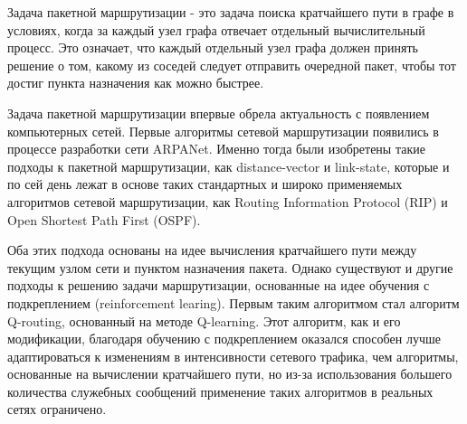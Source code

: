 \documentclass[specification, annotation]{itmo-student-thesis}
\begin{document}
\graphicspath{{img/}}


\tableofcontents

\startprefacepage

Задача пакетной маршрутизации - это задача поиска кратчайшего пути в графе в условиях,
когда за каждый узел графа отвечает отдельный вычислительный процесс. Это
означает, что каждый отдельный узел графа должен принять решение о том, какому
из соседей следует отправить очередной пакет, чтобы тот достиг пункта назначения
как можно быстрее.

Задача пакетной маршрутизации впервые обрела актуальность с появлением
компьютерных сетей. Первые алгоритмы сетевой маршрутизации появились в процессе
разработки сети ARPANet. Именно тогда были изобретены такие подходы к пакетной
маршрутизации, как distance-vector\cite{arpanet-orig} и
link-state\cite{link-state-arpanet}, которые и по сей день лежат в основе таких
стандартных и широко применяемых алгоритмов сетевой маршрутизации, как Routing
Information Protocol (RIP)\cite{rip-rfc} и Open Shortest Path First (OSPF)\cite{ospf-rfc}.

Оба этих подхода основаны на идее вычисления кратчайшего пути между текущим
узлом сети и пунктом назначения пакета. Однако существуют и другие подходы к
решению задачи маршрутизации, основанные на идее обучения с подкреплением
(reinforcement learing). Первым таким алгоритмом стал алгоритм
Q-routing\cite{q-routing-orig}, основанный на методе
Q-learning\cite{q-learning-orig}. Этот алгоритм, как и его
модификации\cite{predictive-q-routing, dual-q-routing},
благодаря обучению с подкреплением оказался способен лучше адаптироваться к
изменениям в интенсивности сетевого трафика, чем алгоритмы, основанные на
вычислении кратчайшего пути, но из-за использования большего количества
служебных сообщений применение таких алгоритмов в реальных сетях ограничено.
\end{document}
